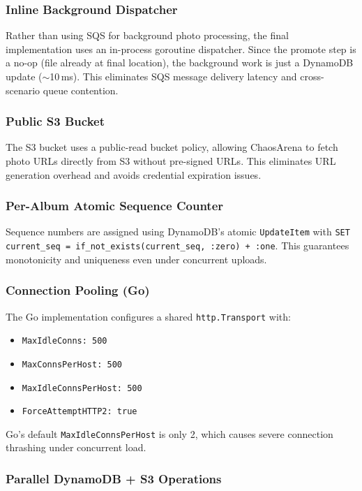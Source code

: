 \documentclass[11pt]{article}
\begin{document}
\subsubsection{Inline Background Dispatcher}

Rather than using SQS for background photo processing, the final implementation uses an in-process goroutine dispatcher. Since the promote step is a no-op (file already at final location), the background work is just a DynamoDB update ($\sim$10\,ms). This eliminates SQS message delivery latency and cross-scenario queue contention.

\subsubsection{Public S3 Bucket}

The S3 bucket uses a public-read bucket policy, allowing ChaosArena to fetch photo URLs directly from S3 without pre-signed URLs. This eliminates URL generation overhead and avoids credential expiration issues.

\subsubsection{Per-Album Atomic Sequence Counter}

Sequence numbers are assigned using DynamoDB's atomic \texttt{UpdateItem} with \texttt{SET current\_seq = if\_not\_exists(current\_seq, :zero) + :one}. This guarantees monotonicity and uniqueness even under concurrent uploads.

\subsubsection{Connection Pooling (Go)}

The Go implementation configures a shared \texttt{http.Transport} with:
\begin{itemize}
    \item \texttt{MaxIdleConns: 500}
    \item \texttt{MaxConnsPerHost: 500}
    \item \texttt{MaxIdleConnsPerHost: 500}
    \item \texttt{ForceAttemptHTTP2: true}
\end{itemize}
Go's default \texttt{MaxIdleConnsPerHost} is only 2, which causes severe connection thrashing under concurrent load.

\subsubsection{Parallel DynamoDB + S3 Operations}
\end{document}
